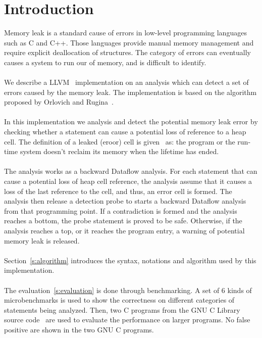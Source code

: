 \section{Introduction}
Memory leak is a standard cause of errors in low-level programming languages
such as C and C++. Those languages provide manual memory management and require
explicit deallocation of structures. The category of errors can eventually
causes a system to run our of memory, and is difficult to identify. \\ \\

We describe a LLVM~\cite{llvm} implementation on an analysis which
can detect a set of errors caused by the memory leak. The implementation is
based on the algorithm proposed by Orlovich and Rugina~\cite{rugina}. \\ \\

In this implementation we analysis and detect the potential memory leak error
by checking whether a statement can cause a potential loss of reference to a 
heap cell. The definition of a leaked (eroor) cell is given~\cite{rugina} as: the 
program or the run-time system doesn't reclaim its memory when the lifetime 
has ended. \\ \\

The analysis works as a backward Dataflow analysis. For each statement that 
can cause a potential loss of heap cell reference, the analysis assume that 
it causes a loss of the last reference to the cell, and thus, an error cell
is formed. The analysis then release a detection probe to starts a backward 
Dataflow analysis from that programming point. If a contradiction is formed 
and the analysis reaches a bottom, the probe statement is proved to be safe. 
Otherwise, if the analysis reaches a top, or it reaches the program entry, 
a warning of potential memory leak is released. \\ \\

Section~\ref{s:algorithm} introduces the syntax, notations and algorithm
used by this implementation. \\ \\

The evaluation~\ref{s:evaluation} is done through benchmarking. A set of 6 kinds
of microbenchmarks is used to show the correctness on different categories of
statements being analyzed. Then, two C programs from the GNU C Library source
code~\cite{glibc} are used to evaluate the performance on larger programs. No 
false positive are shown in the two GNU C programs.
